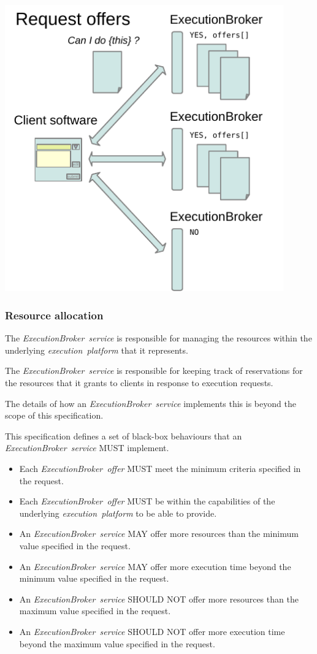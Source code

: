 \documentclass[11pt,a4paper]{ivoa}
\newcommand{\execbrokerservice}[1] {\textit{ExecutionBroker~service#1}}
\newcommand{\execoffer}[1] {\textit{ExecutionBroker~offer#1}}
\newcommand{\execplatform} {\textit{execution~platform}}
\begin{document}
\includegraphics[width=0.9\textwidth]{diagrams/request-offers.pdf}


\subsubsection{Resource allocation}
\label{subsub-resource-allocation}

The \execbrokerservice{} is responsible for managing the resources
within the underlying \execplatform{} that it represents.

The \execbrokerservice{} is responsible for keeping track of
reservations for the resources that it grants to clients in
response to execution requests.

The details of how an \execbrokerservice{} implements this is
beyond the scope of this specification.

This specification defines a set of black-box behaviours
that an \execbrokerservice{} MUST implement.

\begin{itemize}
    \item Each \execoffer{} MUST meet the minimum criteria specified in the request.
    \item Each \execoffer{} MUST be within the capabilities of the underlying \execplatform{} to be able to provide.

    \item An \execbrokerservice{} MAY offer more resources than the minimum value specified in the request.
    \item An \execbrokerservice{} MAY offer more execution time beyond the minimum value specified in the request.

    \item An \execbrokerservice{} SHOULD NOT offer more resources than the maximum value specified in the request.
    \item An \execbrokerservice{} SHOULD NOT offer more execution time beyond the maximum value specified in the request.
\end{itemize}
\end{document}
